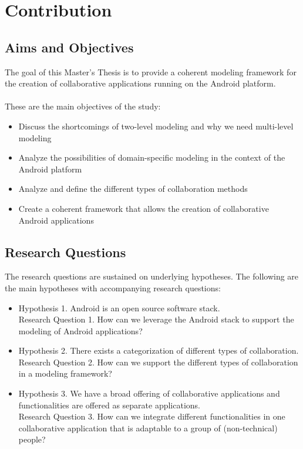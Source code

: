 \section{Contribution}

\subsection{Aims and Objectives}

The goal of this Master's Thesis is to provide a coherent modeling framework for the creation of collaborative applications running on the Android platform. 
\\ \\
These are the main objectives of the study:

\begin{itemize}
\item{Discuss the shortcomings of two-level modeling and why we need multi-level modeling}
\item{Analyze the possibilities of domain-specific modeling in the context of the Android platform}
\item{Analyze and define the different types of collaboration methods}
\item{Create a coherent framework that allows the creation of collaborative Android applications}
\end{itemize}

\subsection{Research Questions}

The research questions are sustained on underlying hypotheses. The following are the main hypotheses with accompanying research questions:

\begin{itemize}
\item{Hypothesis 1. Android is an open source software stack. \\
Research Question 1. How can we leverage the Android stack to support the modeling of Android applications?}
\item{Hypothesis 2. There exists a categorization of different types of collaboration. \\
Research Question 2. How can we support the different types of collaboration in a modeling framework?}
\item{Hypothesis 3. We have a broad offering of collaborative applications and functionalities are offered as separate applications. \\
Research Question 3. How can we integrate different functionalities in one collaborative application that is adaptable to a group of (non-technical) people?}
\end{itemize}

